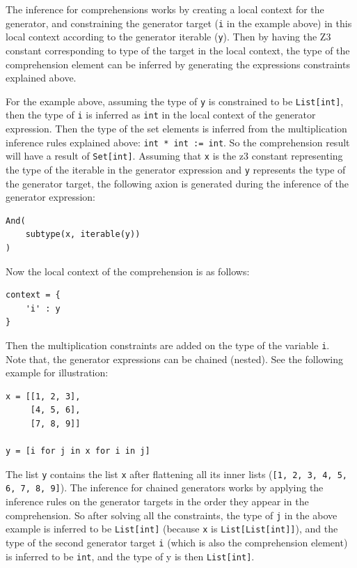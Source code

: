 The inference for comprehensions works by creating a local context for the generator, and constraining the generator target (\lstinline|i| in the example above) in this local context according to the generator iterable (\lstinline|y|). Then by having the Z3 constant corresponding to type of the target in the local context, the type of the comprehension element can be inferred by generating the expressions constraints explained above.

For the example above, assuming the type of \lstinline|y| is constrained to be \lstinline|List[int]|, then the type of \lstinline|i| is inferred as \lstinline|int| in the local context of the generator expression. Then the type of the set elements is inferred from the multiplication inference rules explained above: \lstinline|int * int := int|. So the comprehension result will have a result of \lstinline|Set[int]|. Assuming that \lstinline|x| is the z3 constant representing the type of the iterable in the generator expression and \lstinline|y| represents the type of the generator target, the following axion is generated during the inference of the generator expression:
\begin{lstlisting}
And(
	subtype(x, iterable(y))
)
\end{lstlisting}
Now the local context of the comprehension is as follows:
\begin{lstlisting}
context = {
	'i' : y
}
\end{lstlisting}
Then the multiplication constraints are added on the type of the variable \lstinline|i|. \\

Note that, the generator expressions can be chained (nested). See the following example for illustration:

\begin{lstlisting}
x = [[1, 2, 3],
     [4, 5, 6],
     [7, 8, 9]]
	 
y = [i for j in x for i in j]
\end{lstlisting}

The list \lstinline|y| contains the list \lstinline|x| after flattening all its inner lists (\lstinline|[1, 2, 3, 4, 5, 6, 7, 8, 9]|). The inference for chained generators works by applying the inference rules on the generator targets in the order they appear in the comprehension. So after solving all the constraints, the type of \lstinline|j| in the above example is inferred to be \lstinline|List[int]| (because \lstinline|x| is \lstinline|List[List[int]]|), and the type of the second generator target \lstinline|i| (which is also the comprehension element) is inferred to be \lstinline|int|, and the type of y is then \lstinline|List[int]|.

